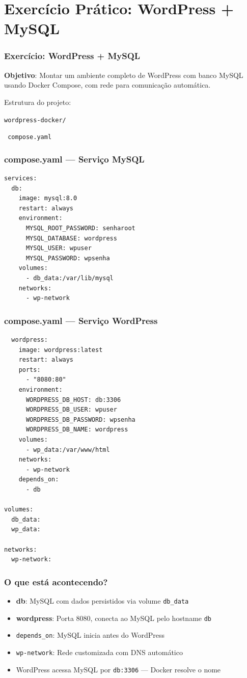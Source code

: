 \section{Exercício Prático: WordPress + MySQL}

\begin{frame}
  \frametitle{Exercício: WordPress + MySQL}
  \textbf{Objetivo}: Montar um ambiente completo de WordPress com banco MySQL
  usando Docker Compose, com rede para comunicação automática.

  \vspace{0.5em}
  Estrutura do projeto:

  \vspace{0.3em}
  \texttt{wordpress-docker/}

  \texttt{  compose.yaml}
\end{frame}

\begin{frame}[fragile]
  \frametitle{compose.yaml — Serviço MySQL}
  \small
\begin{verbatim}
services:
  db:
    image: mysql:8.0
    restart: always
    environment:
      MYSQL_ROOT_PASSWORD: senharoot
      MYSQL_DATABASE: wordpress
      MYSQL_USER: wpuser
      MYSQL_PASSWORD: wpsenha
    volumes:
      - db_data:/var/lib/mysql
    networks:
      - wp-network
\end{verbatim}
\end{frame}

\begin{frame}[fragile]
  \frametitle{compose.yaml — Serviço WordPress}
  \small
\begin{verbatim}
  wordpress:
    image: wordpress:latest
    restart: always
    ports:
      - "8080:80"
    environment:
      WORDPRESS_DB_HOST: db:3306
      WORDPRESS_DB_USER: wpuser
      WORDPRESS_DB_PASSWORD: wpsenha
      WORDPRESS_DB_NAME: wordpress
    volumes:
      - wp_data:/var/www/html
    networks:
      - wp-network
    depends_on:
      - db

volumes:
  db_data:
  wp_data:

networks:
  wp-network:
\end{verbatim}
\end{frame}

\begin{frame}
  \frametitle{O que está acontecendo?}
  \begin{itemize}
    \item \textbf{db}: MySQL com dados persistidos via volume \texttt{db\_data}
    \item \textbf{wordpress}: Porta 8080, conecta ao MySQL pelo hostname \texttt{db}
    \item \texttt{depends\_on}: MySQL inicia antes do WordPress
    \item \texttt{wp-network}: Rede customizada com DNS automático
    \item WordPress acessa MySQL por \texttt{db:3306} — Docker resolve o nome
  \end{itemize}
\end{frame}

